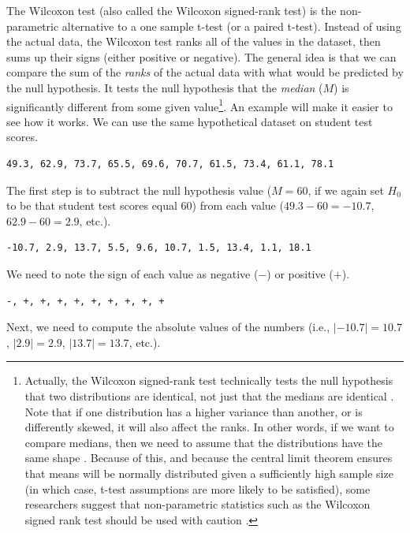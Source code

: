 \documentclass[
  openany]{krantz}
\begin{document}
The Wilcoxon test (also called the Wilcoxon signed-rank test) is the non-parametric alternative to a one sample t-test (or a paired t-test).
Instead of using the actual data, the Wilcoxon test ranks all of the values in the dataset, then sums up their signs (either positive or negative).
The general idea is that we can compare the sum of the \emph{ranks} of the actual data with what would be predicted by the null hypothesis.
It tests the null hypothesis that the \emph{median} (\(M\)) is significantly different from some given value\footnote{Actually, the Wilcoxon signed-rank test technically tests the null hypothesis that two distributions are identical, not just that the medians are identical \citep{Johnson1995, Lumley2002}. Note that if one distribution has a higher variance than another, or is differently skewed, it will also affect the ranks. In other words, if we want to compare medians, then we need to assume that the distributions have the same shape \citep{Lumley2002}. Because of this, and because the central limit theorem ensures that means will be normally distributed given a sufficiently high sample size (in which case, t-test assumptions are more likely to be satisfied), some researchers suggest that non-parametric statistics such as the Wilcoxon signed rank test should be used with caution \citep{Johnson1995}.}.
An example will make it easier to see how it works.
We can use the same hypothetical dataset on student test scores.

\begin{verbatim}
49.3, 62.9, 73.7, 65.5, 69.6, 70.7, 61.5, 73.4, 61.1, 78.1
\end{verbatim}

The first step is to subtract the null hypothesis value (\(M = 60\), if we again set \(H_{0}\) to be that student test scores equal 60) from each value (\(49.3 - 60 = -10.7\), \(62.9 - 60 = 2.9\), etc.).

\begin{verbatim}
-10.7, 2.9, 13.7, 5.5, 9.6, 10.7, 1.5, 13.4, 1.1, 18.1
\end{verbatim}

We need to note the sign of each value as negative (\(-\)) or positive (\(+\)).

\begin{verbatim}
-, +, +, +, +, +, +, +, +, +
\end{verbatim}

Next, we need to compute the absolute values of the numbers (i.e., \(|-10.7| = 10.7\), \(|2.9| = 2.9\), \(|13.7| = 13.7\), etc.).
\end{document}
